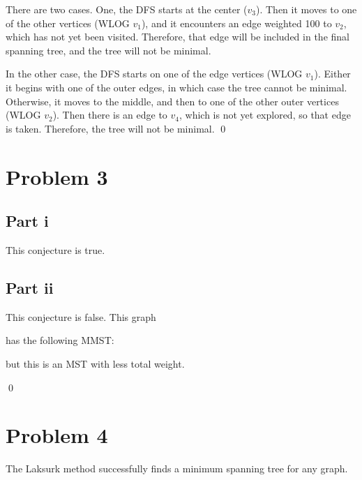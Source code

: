 \documentclass[twoside]{amsart}
\begin{document}
There are two cases.  One, the DFS starts at the center ($v_3$).  Then it
moves to one of the other vertices (WLOG $v_1$), and it encounters an
edge weighted 100 to $v_2$, which has not yet been visited.
Therefore, that edge will be included in the final spanning tree, and
the tree will not be minimal.

In the other case, the DFS starts on one of the edge vertices (WLOG
$v_1$).  Either it begins with one of the outer edges, in which case
the tree cannot be minimal.  Otherwise, it moves to the middle, and
then to one of the other outer vertices (WLOG $v_2$).  Then there is
an edge to $v_4$, which is not yet explored, so that edge is taken.
Therefore, the tree will not be minimal. \qed

\section*{Problem 3}

\subsection*{Part i}

This conjecture is true.

\subsection*{Part ii}

This conjecture is false. This graph


has the following MMST:


but this is an MST with less total weight.


\qed

\section*{Problem 4}

The Laksurk method successfully finds a minimum spanning tree for any
graph.  
\end{document}

